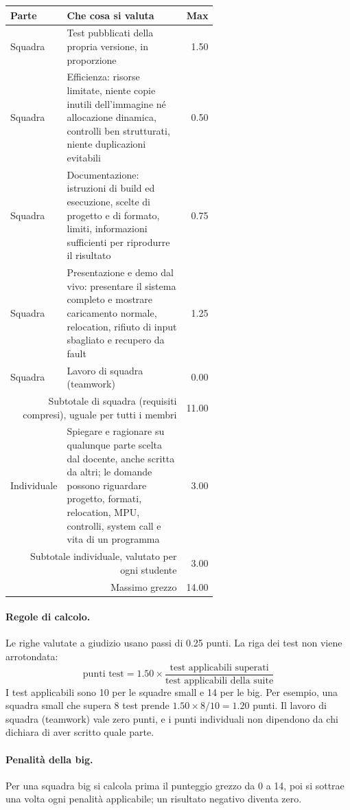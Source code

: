 \begin{center}
\small
\begin{tabular}{|l|p{0.6\linewidth}|r|}
\hline
Parte & \raggedright Che cosa si valuta & Max \tabularnewline
\hline\hline
Squadra & \raggedright Test pubblicati della propria versione, in proporzione & 1.50 \tabularnewline
\hline
Squadra & \raggedright Efficienza: risorse limitate, niente copie inutili dell'immagine né allocazione dinamica, controlli ben strutturati, niente duplicazioni evitabili & 0.50 \tabularnewline
\hline
Squadra & \raggedright Documentazione: istruzioni di build ed esecuzione, scelte di progetto e di formato, limiti, informazioni sufficienti per riprodurre il risultato & 0.75 \tabularnewline
\hline
Squadra & \raggedright Presentazione e demo dal vivo: presentare il sistema completo e mostrare caricamento normale, relocation, rifiuto di input sbagliato e recupero da fault & 1.25 \tabularnewline
\hline
Squadra & \raggedright Lavoro di squadra (teamwork) & 0.00 \tabularnewline
\hline
\multicolumn{2}{|r|}{Subtotale di squadra (requisiti compresi), uguale per tutti i membri} & 11.00 \tabularnewline
\hline
Individuale & \raggedright Spiegare e ragionare su qualunque parte scelta dal docente, anche scritta da altri; le domande possono riguardare progetto, formati, relocation, MPU, controlli, system call e vita di un programma & 3.00 \tabularnewline
\hline
\multicolumn{2}{|r|}{Subtotale individuale, valutato per ogni studente} & 3.00 \tabularnewline
\hline
\multicolumn{2}{|r|}{Massimo grezzo} & 14.00 \tabularnewline
\hline
\end{tabular}
\end{center}

\paragraph{Regole di calcolo.} Le righe valutate a giudizio usano passi di 0.25 punti. La riga dei test non viene arrotondata:
\[
\mbox{punti test} = 1.50 \times \frac{\mbox{test applicabili superati}}{\mbox{test applicabili della suite}}
\]
I test applicabili sono 10 per le squadre small e 14 per le big. Per esempio, una squadra small che supera 8 test prende $1.50 \times 8 / 10 = 1.20$ punti. Il lavoro di squadra (teamwork) vale zero punti, e i punti individuali non dipendono da chi dichiara di aver scritto quale parte.

\paragraph{Penalità della big.} Per una squadra big si calcola prima il punteggio grezzo da 0 a 14, poi si sottrae una volta ogni penalità applicabile; un risultato negativo diventa zero.

